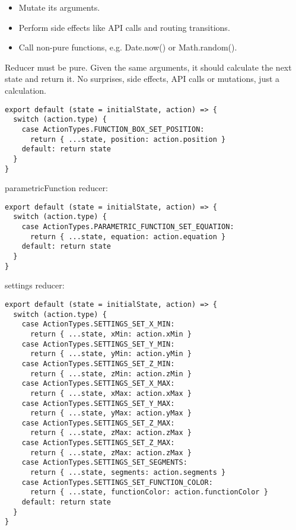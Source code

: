 \begin{itemize}
\item{Mutate its arguments.}
\item{Perform side effects like API calls and routing transitions.}
\item{Call non-pure functions, e.g. Date.now() or Math.random().}
\end{itemize}

Reducer must be pure. Given the same arguments, it should calculate the next state and return it. No surprises, side effects, API calls or mutations, just a calculation.


\begin{lstlisting}[caption={\textsl{functionBox} reducer.},captionpos=b]
export default (state = initialState, action) => {
  switch (action.type) {
    case ActionTypes.FUNCTION_BOX_SET_POSITION:
      return { ...state, position: action.position }
    default: return state
  }
}
\end{lstlisting}

parametricFunction reducer:


\begin{lstlisting}
export default (state = initialState, action) => {
  switch (action.type) {
    case ActionTypes.PARAMETRIC_FUNCTION_SET_EQUATION:
      return { ...state, equation: action.equation }
    default: return state
  }
}
\end{lstlisting}

settings reducer:


\begin{lstlisting}
export default (state = initialState, action) => {
  switch (action.type) {
    case ActionTypes.SETTINGS_SET_X_MIN:
      return { ...state, xMin: action.xMin }
    case ActionTypes.SETTINGS_SET_Y_MIN:
      return { ...state, yMin: action.yMin }
    case ActionTypes.SETTINGS_SET_Z_MIN:
      return { ...state, zMin: action.zMin }
    case ActionTypes.SETTINGS_SET_X_MAX:
      return { ...state, xMax: action.xMax }
    case ActionTypes.SETTINGS_SET_Y_MAX:
      return { ...state, yMax: action.yMax }
    case ActionTypes.SETTINGS_SET_Z_MAX:
      return { ...state, zMax: action.zMax }
    case ActionTypes.SETTINGS_SET_Z_MAX:
      return { ...state, zMax: action.zMax }
    case ActionTypes.SETTINGS_SET_SEGMENTS:
      return { ...state, segments: action.segments }
    case ActionTypes.SETTINGS_SET_FUNCTION_COLOR:
      return { ...state, functionColor: action.functionColor }
    default: return state
  }
}
\end{lstlisting}

